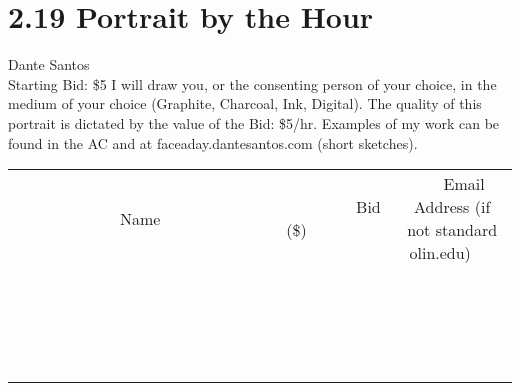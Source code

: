 \documentclass[11pt]{article}
\begin{document}
\section*{2.19 Portrait by the Hour}
Dante Santos
\\
Starting Bid: \$5
\newline
I will draw you, or the consenting person of your choice, in the medium of your choice (Graphite, Charcoal, Ink, Digital).  The quality of this portrait is dictated by the value of the Bid:  \$5/hr.  Examples of my work can be found in the AC and at faceaday.dantesantos.com (short sketches).
\\[3ex]
\begin{tabular}{c c c}
~~~~~~~~~~~~~Name~~~~~~~~~~~~~ & ~~~~~~~~~Bid (\$)~~~~~~~~~  & ~~~Email Address (if not standard olin.edu)~~~\\
 & & \\
\hline
 & & \\
\hline
 & & \\
\hline
 & & \\
\hline
 & & \\
\hline
 & & \\
\hline
 & & \\
\hline
 & & \\
\hline
 & & \\
\hline
 & & \\
\hline
 & & \\
\hline
 & & \\
\hline
 & & \\
\hline
 & & \\
\hline
 & & \\
\hline
 & & \\
\hline
 & & \\
\hline
 & & \\
\hline
 & & \\
\hline
\end{tabular}
\newpage
\end{document}
